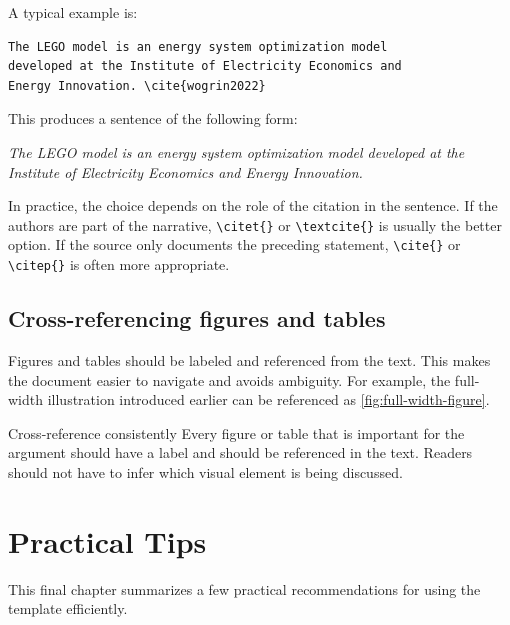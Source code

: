 \documentclass[11pt,a4paper]{report}
\begin{document}
A typical example is:

\begin{coloredBlock}[grey]{}
\begin{verbatim}
The LEGO model is an energy system optimization model
developed at the Institute of Electricity Economics and
Energy Innovation. \cite{wogrin2022}
\end{verbatim}
\end{coloredBlock}

This produces a sentence of the following form:

\textit{The LEGO model is an energy system optimization model developed at the Institute of Electricity Economics and Energy Innovation. \cite{wogrin2022}}

In practice, the choice depends on the role of the citation in the sentence. If the authors are part of the narrative, \texttt{\textbackslash citet\{\}} or \texttt{\textbackslash textcite\{\}} is usually the better option. If the source only documents the preceding statement, \texttt{\textbackslash cite\{\}} or \texttt{\textbackslash citep\{\}} is often more appropriate.

\section{Cross-referencing figures and tables}

Figures and tables should be labeled and referenced from the text. This makes the document easier to navigate and avoids ambiguity. For example, the full-width illustration introduced earlier can be referenced as \autoref{fig:full-width-figure}.

\begin{coloredBlock}[blue]{Cross-reference consistently}
Every figure or table that is important for the argument should have a label and should be referenced in the text. Readers should not have to infer which visual element is being discussed.
\end{coloredBlock}

\clearpage

\chapter{Practical Tips}

This final chapter summarizes a few practical recommendations for using the template efficiently.
\end{document}
